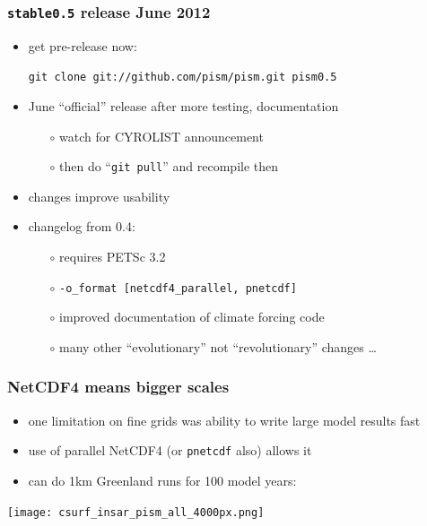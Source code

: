 \documentclass[hide notes,intlimits]{beamer}
\begin{document}
\begin{frame}
  \frametitle{\texttt{stable0.5} release June 2012}

  \begin{itemize}
  \item get pre-release now:
    \begin{center}
    \texttt{git clone git://github.com/pism/pism.git pism0.5}
    \end{center}
  \item June ``official'' release after more testing, documentation
    \begin{itemize}
    \item[$\circ$] watch for CYROLIST announcement
    \item[$\circ$] then do ``\texttt{git pull}'' and recompile then
    \end{itemize}
  \item changes improve usability\!
  \item changelog from 0.4:
    \begin{itemize}
    \item[$\circ$] requires PETSc 3.2
    \item[$\circ$] \texttt{-o\_format [netcdf4\_parallel, pnetcdf]}
    \item[$\circ$] improved documentation of climate forcing code
    \item[$\circ$] many other ``evolutionary'' not ``revolutionary'' changes \dots
    \end{itemize}
  \end{itemize}
\end{frame}


\begin{frame}
  \frametitle{NetCDF4 means bigger scales}

  \begin{itemize}
  \item one limitation on fine grids was ability to write large model results fast
  \item use of parallel NetCDF4 (or \texttt{pnetcdf} also) allows it
  \item can do 1km Greenland runs for 100 model years:
  \end{itemize}
  
    \vspace{-2mm}
    \begin{center}
    \texttt{[image: csurf\_insar\_pism\_all\_4000px.png]}
    \end{center}
\end{frame}
\end{document}
